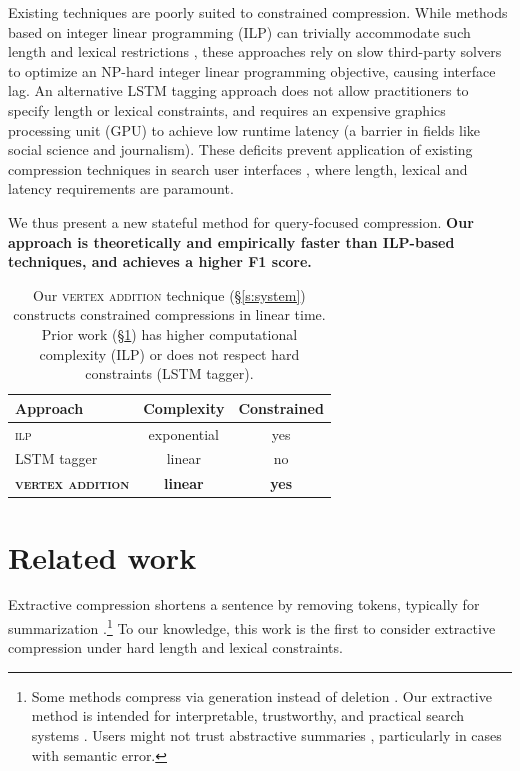 \documentclass[11pt,a4paper]{article}
\begin{document}
Existing techniques are poorly suited to constrained compression. While methods based on integer linear programming (ILP) can trivially accommodate such length and lexical restrictions \cite{clarke2008global,filippova2013overcoming,Wang2017CanSH}, these approaches rely on slow third-party solvers to optimize an NP-hard integer linear programming objective, causing interface lag. An alternative LSTM tagging approach \cite{filippova2015sentence} does not allow practitioners to specify length or lexical constraints, and requires an expensive graphics processing unit (GPU) to achieve low runtime latency (a barrier in fields like social science and journalism). These deficits prevent application of existing compression techniques in search user interfaces \cite{marchionini2006exploratory,hearst2009search}, where length, lexical and latency requirements are paramount.

We thus present a new stateful method for query-focused compression. \textbf{Our approach is theoretically and empirically faster than ILP-based techniques, and achieves a higher F1 score.}


\begin{table}[htb!]
\begin{tabular}{lcc}
Approach & Complexity & Constrained  \\ \hline
\textsc{ilp}       &   exponential    & yes     \\
LSTM tagger & linear              & no         \\   
\textbf{\textsc{vertex addition}} & \textbf{linear}     &      \textbf{yes}   
\end{tabular}
\caption{Our \textsc{vertex addition} technique (\S\ref{s:system}) constructs constrained compressions in linear time. Prior work (\S\ref{s:relatedwork}) has higher computational complexity (\textsc{ILP}) or does not respect hard constraints (LSTM tagger).} 
\label{t:algos}
\end{table}

\section{Related work}\label{s:relatedwork}

Extractive compression shortens a sentence by removing tokens, typically for summarization \cite{Knight2000StatisticsBasedS,clarke2008global,filippova2015sentence,Wang2017CanSH}.\footnote{Some methods compress via generation instead of deletion \cite{rush2015neural,mallinson18}. Our extractive method is intended for interpretable, trustworthy, and practical search systems \cite{Chuang2012InterpretationAT}. Users might not trust abstractive summaries \cite{Zhang:2018:MSG:3290265.3274465}, particularly in cases with semantic error.} To our knowledge, this work is the first to consider extractive compression under hard length and lexical constraints.
\end{document}
